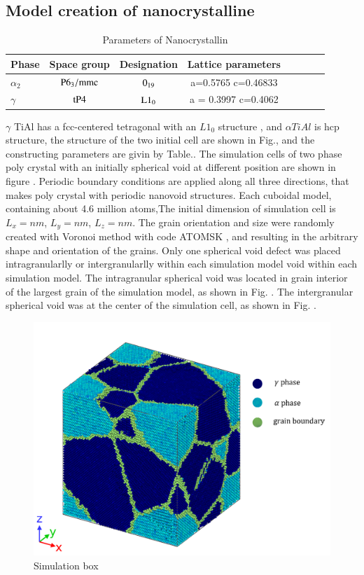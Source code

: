 \documentclass[final,5p,times,twocolumn]{elsarticle}
\begin{document}
\subsection{Model creation of nanocrystalline}

\begin{table}[h]
	\centering
	\caption{Parameters of  Nanocrystallin}
	\begin{tabular}{l*{6}{c}r}
			\hline
			Phase			& Space group		& Designation		& Lattice parameters \\
			\hline
			$\alpha_2$		& $\rm P6_3/mmc$ 	& $\rm 0_{19}$ 		& a=0.5765 c=0.46833  \\
			$\gamma$		& $\rm tP4$ 		& $\rm L1_0$			& a = 0.3997 c=0.4062 \\
			\hline
	\end{tabular}
	\label{Tab:model-parameter}
	\end{table}

$\gamma $ TiAl has a fcc-centered tetragonal with an $L1_0$ structure \cite{}, and $\alpha TiAl$ is hcp structure, the structure of the two initial cell are shown in Fig.\cite{}, and the constructing parameters are givin by Table.\cite{}. The simulation cells of two phase poly crystal with an initially spherical void at different position are shown in figure \cite{}. Periodic boundary conditions are applied along all three directions, that makes poly crystal with periodic nanovoid structures. Each cuboidal model, containing about 4.6 million atoms,The initial dimension of simulation cell is  $L_x = nm$, $L_y =  nm$, $L_z =  nm$. The grain orientation and size were randomly created with Voronoi method with code ATOMSK \cite{}, and resulting in the arbitrary shape and orientation of the grains. Only one spherical void defect was placed intragranularlly or intergranularlly within each simulation model void within each simulation model. The intragranular spherical void was located in grain interior of the largest grain of the simulation model, as shown in Fig. \cite{}. The intergranular spherical void was at the center of the simulation cell, as shown in Fig. \cite{}.
\begin{figure}
	\centering
	\includegraphics[width=0.7\linewidth]{img/pf_model_labeled}
	\caption{Simulation box}

\end{figure}
\end{document}
